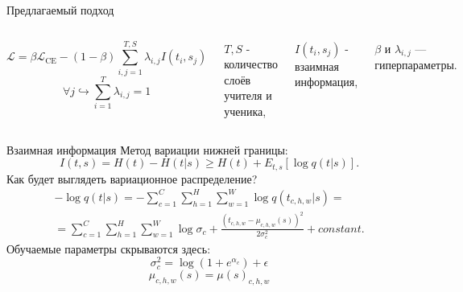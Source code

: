 \documentclass{beamer}
\begin{document}
\begin{frame}{Предлагаемый подход}
    \begin{columns}[c]
        \begin{equation}
            \mathcal{L} = \beta \mathcal{L}_\text{CE} - (1 - \beta){\sum_{i, j=1}^{T, S}\lambda_{i, j}I(t_{i}, s_{j})}
        \end{equation}
        \vspace*{-\baselineskip}\setlength\belowdisplayshortskip{0pt}
        \begin{equation}
            \forall j \hookrightarrow  \sum_{i=1}^{T}\lambda_{i, j} = 1
        \end{equation}

        $T, S$ - количество слоёв учителя и ученика,

        $I(t_{i}, s_{j})$ - взаимная информация,

        $\beta$ и $\lambda_{i, j}$ --- гиперпараметры.
    \end{columns}

\end{frame}


\begin{frame}{Взаимная информация}
    Метод вариации нижней границы:
    \begin{equation}
        I(t, s) = H(t) - H(t|s) \geq  H(t) + E_{t,s}[\log{q(t|s)}].
    \end{equation}
    Как будет выглядеть вариационное распределение?
    \begin{multline}
        -\log{q(t|s)} = -\sum_{c=1}^{C}  \sum_{h=1}^{H} \sum_{w=1}^{W} \log{q(t_{c,h,w}|s)} = \\
        = \sum_{c=1}^{C}  \sum_{h=1}^{H} \sum_{w=1}^{W} \log{\sigma_c} + \frac{(t_{c,h,w} - \mu_{c,h,w}(s))^2}{2\sigma_c^2} + constant.
    \end{multline}
    Обучаемые параметры скрываются здесь:
    $$\sigma^2_c = \log{(1 + e^{\alpha_c})} + \epsilon$$
    $$\mu_{c,h,w}(s) = \mu(s)_{c,h,w}$$
\end{frame}

\end{document}

